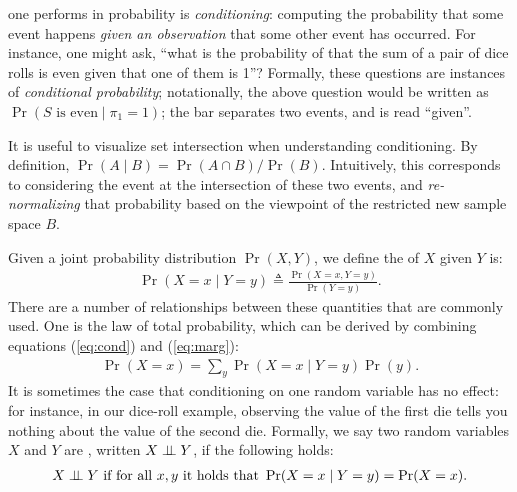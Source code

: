 \documentclass{tufte-handout}
\begin{document}
 one performs in probability is
\emph{conditioning}: computing the probability that some event happens
\emph{given an observation} that some other event has occurred. For instance,
one might ask, ``what is the probability of that the sum of a pair of dice rolls
is even given that one of them is 1''? Formally, these questions are instances
of \emph{conditional probability}; notationally, the above question would be 
written as $\Pr( S \text { is even} \mid \pi_1 = 1)$; the bar separates two
events, and is read ``given''.


\begin{marginfigure}
    \caption{It is useful to visualize set intersection when understanding conditioning. 
    By definition, $\Pr(A \mid B) = \Pr(A \cap B)/\Pr(B)$. Intuitively, this corresponds to 
    considering the event at the intersection of these two events, and \emph{re-normalizing}
    that probability based on the viewpoint of the restricted new sample space $B$.
    }
\end{marginfigure}
Given a joint probability distribution $\Pr(X, Y)$, we define the 
of $X$ given $Y$ is:
\begin{align}
    \Pr(X=x \mid Y = y) \triangleq \frac{\Pr(X = x, Y = y)}{\Pr(Y = y)}.
    \label{eq:cond}
\end{align}
There are a number of relationships between these quantities that are commonly used.
One is the law of total probability, which can be derived by
combining equations (\ref{eq:cond}) and (\ref{eq:marg}):
\begin{align}
    \Pr(X=x) = \sum_y \Pr(X = x \mid Y = y)\Pr(y).
\end{align}
It is sometimes the case that conditioning on one random variable has no effect:
for instance, in our dice-roll example, observing the value of the first die
tells you nothing about the value of the second die. Formally, we say two 
random variables $X$ and $Y$ are , written $X \perp \!\!\! \perp Y$, if 
the following holds:
\begin{align*}
    X \perp \!\!\! \perp Y \text{ if for all }x, y \text{ it holds that } \Pr(X=x \mid Y=y) = \Pr(X = x).
\end{align*}
\end{document}
